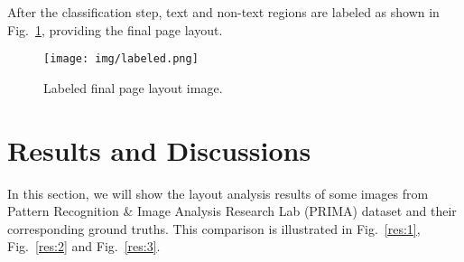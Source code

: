 \documentclass[conference]{IEEEtran}
\begin{document}
    After the classification step, text and non-text regions are labeled as shown
    in Fig.~\ref{img:labeled}, providing the final page layout.

    \begin{figure}[htbp]
        \centerline{\texttt{[image: img/labeled.png]}}
        \caption{Labeled final page layout image.}
        \label{img:labeled}
    \end{figure}

    \section{Results and Discussions}\label{sect:3}
    
    In this section, we will show the layout analysis results of some images from
    Pattern Recognition \& Image Analysis Research Lab (PRIMA) dataset and their
    corresponding ground truths.
    This comparison is illustrated in Fig.~\ref{res:1}, Fig.~\ref{res:2} and Fig.~\ref{res:3}.
\end{document}
